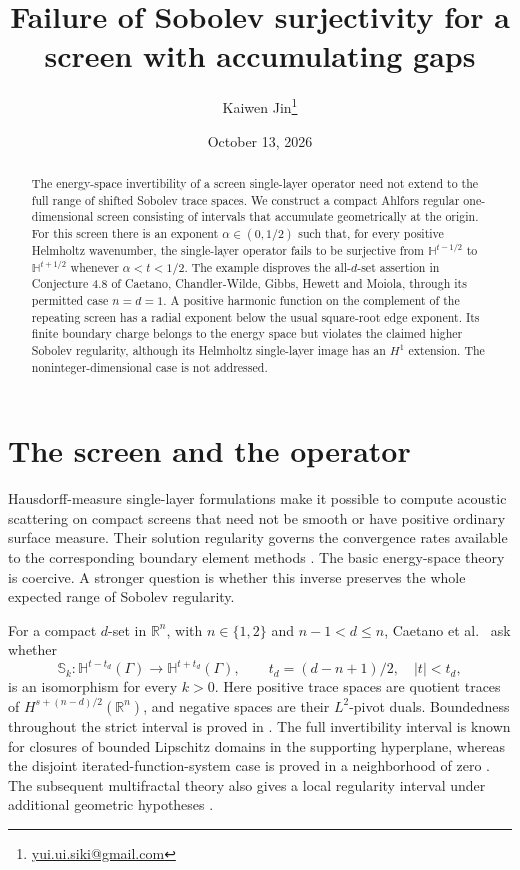 \documentclass[11pt]{article}
\title{Failure of Sobolev surjectivity for a screen with accumulating gaps}
\author{Kaiwen Jin\thanks{\href{mailto:yui.ui.siki@gmail.com}{yui.ui.siki@gmail.com}}}
\date{October 13, 2026}
\newcommand{\hH}{\mathbb H}
\newcommand{\R}{\mathbb R}
\begin{document}
\maketitle
\begin{abstract}
The energy-space invertibility of a screen single-layer operator need not
extend to the full range of shifted Sobolev trace spaces. We construct a
compact Ahlfors regular one-dimensional screen consisting of intervals that
accumulate geometrically at the origin. For this screen there is an exponent
\(\alpha\in(0,1/2)\) such that, for every positive Helmholtz wavenumber, the
single-layer operator fails to be surjective from
\(\hH^{t-1/2}\) to \(\hH^{t+1/2}\) whenever \(\alpha<t<1/2\).
The example disproves the all-\(d\)-set assertion in Conjecture 4.8 of
Caetano, Chandler-Wilde, Gibbs, Hewett and Moiola, through its permitted case
\(n=d=1\). A positive harmonic function on the complement of the repeating
screen has a radial exponent below the usual square-root edge exponent.
Its finite boundary charge belongs to the energy space but violates the
claimed higher Sobolev regularity, although its Helmholtz single-layer
image has an \(H^1\) extension. The noninteger-dimensional case is not
addressed.
\end{abstract}

\section{The screen and the operator}\label{sec:screen}

Hausdorff-measure single-layer formulations make it possible to compute
acoustic scattering on compact screens that need not be smooth or have
positive ordinary surface measure. Their solution regularity governs the
convergence rates available to the corresponding boundary element methods
\cite{CGH}. The basic energy-space theory is coercive. A stronger question
is whether this inverse preserves the whole expected range of Sobolev
regularity.

For a compact \(d\)-set in \(\R^n\), with \(n\in\{1,2\}\) and
\(n-1<d\le n\), Caetano et al.\ \cite[Conjecture 4.8]{CGH} ask whether
\[
 \mathbb S_k:\hH^{t-t_d}(\Gamma)\longrightarrow
                   \hH^{t+t_d}(\Gamma),\qquad
 t_d=(d-n+1)/2,
 \quad |t|<t_d,
\]
is an isomorphism for every \(k>0\).
Here positive trace spaces are quotient traces of
\(H^{s+(n-d)/2}(\R^n)\), and negative spaces are their \(L^2\)-pivot duals.
Boundedness throughout the strict interval is proved in
\cite[Proposition 4.7]{CGH}. The full invertibility interval is known for
closures of bounded Lipschitz domains in the supporting hyperplane, whereas
the disjoint iterated-function-system case is proved in a neighborhood of
zero \cite[discussion preceding Conjecture 4.8 and Proposition 4.9]{CGH}.
The subsequent multifractal theory also gives a local regularity interval
under additional geometric hypotheses \cite[Proposition 4.10]{MF}.
\end{document}

